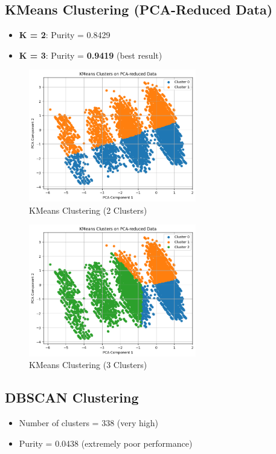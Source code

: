 \documentclass{article}
\begin{document}
\subsection*{KMeans Clustering (PCA-Reduced Data)}
\begin{itemize}
    \item \textbf{K = 2}: Purity = 0.8429
    \item \textbf{K = 3}: Purity = \textbf{0.9419} (best result)
\end{itemize}

\begin{figure}[H]
\centering
\includegraphics[width=0.65\textwidth]{KMeans_clustering_2.png}
\caption{KMeans Clustering (2 Clusters)}
\end{figure}

\begin{figure}[H]
\centering
\includegraphics[width=0.65\textwidth]{KMeans_clustering_3.png}
\caption{KMeans Clustering (3 Clusters)}
\end{figure}

\subsection*{DBSCAN Clustering}
\begin{itemize}
    \item Number of clusters = 338 (very high)
    \item Purity = 0.0438 (extremely poor performance)
\end{itemize}
\end{document}
